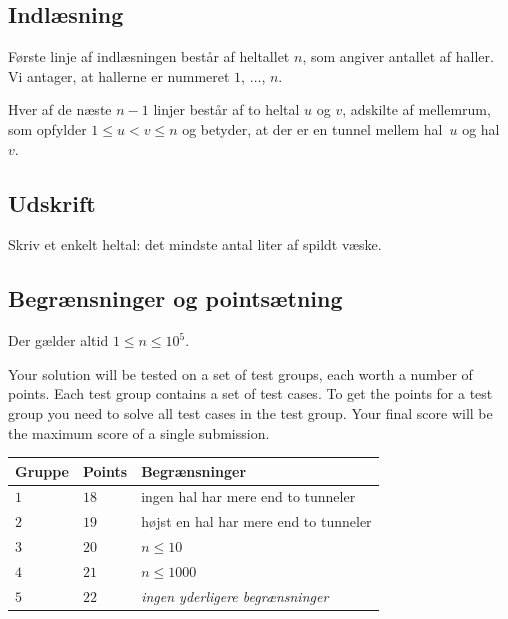 \subsection*{Indlæsning}

Første linje af indlæsningen består af heltallet $n$, som angiver antallet af haller.
Vi antager, at hallerne er nummeret $1$, $\ldots$, $n$.

Hver af de næste $n-1$ linjer består af to heltal $u$ og $v$, adskilte af mellemrum, som opfylder
$1\leq u < v \leq n$ %
og betyder, at der er en tunnel mellem hal~$u$ og hal~$v$.

\subsection*{Udskrift}

Skriv et enkelt heltal: det mindste antal liter af spildt væske.

\subsection*{Begrænsninger og pointsætning}

Der gælder altid
$1\leq n\leq 10^5$. %

Your solution will be tested on a set of test groups, each worth a number of points.
Each test group contains a set of test cases.
To get the points for a test group you need to solve all test cases in the test group.
Your final score will be the maximum score of a single submission.

\medskip
\begin{tabular}{lll}
  Gruppe & Points & Begrænsninger \\\hline
  $1$ & $18$ & ingen hal har mere end to tunneler\\
  $2$ & $19$ & højst en hal har mere end to tunneler\\
  $3$ & $20$ & $n\leq 10$\\
  $4$ & $21$ & $n\leq 1000$\\
  $5$ & $22$ & \emph{ingen yderligere begrænsninger}
\end{tabular}
